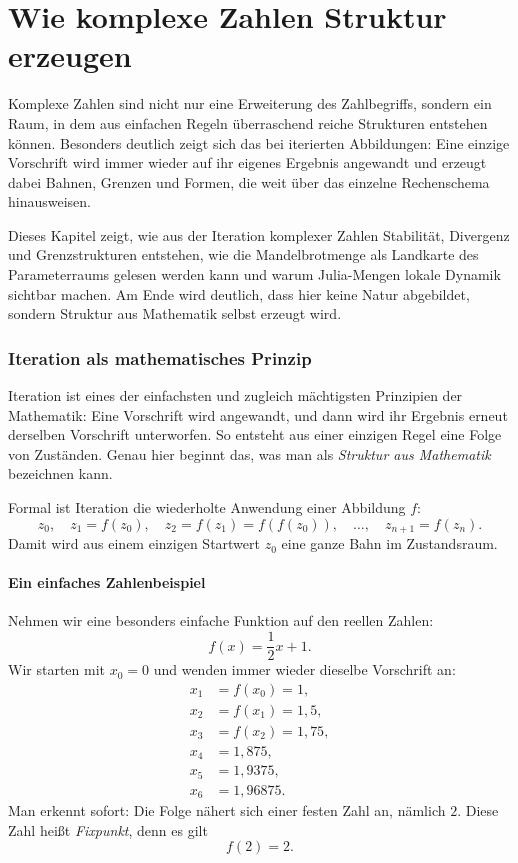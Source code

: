 \chapter{Wie komplexe Zahlen Struktur erzeugen}
\label{chap:VII_komplexe_struktur}

Komplexe Zahlen sind nicht nur eine Erweiterung des Zahlbegriffs,
sondern ein Raum, in dem aus einfachen Regeln überraschend reiche Strukturen entstehen können.
Besonders deutlich zeigt sich das bei iterierten Abbildungen:
Eine einzige Vorschrift wird immer wieder auf ihr eigenes Ergebnis angewandt
und erzeugt dabei Bahnen, Grenzen und Formen,
die weit über das einzelne Rechenschema hinausweisen.

Dieses Kapitel zeigt,
wie aus der Iteration komplexer Zahlen Stabilität, Divergenz und Grenzstrukturen entstehen,
wie die Mandelbrotmenge als Landkarte des Parameterraums gelesen werden kann
und warum Julia-Mengen lokale Dynamik sichtbar machen.
Am Ende wird deutlich,
dass hier keine Natur abgebildet,
sondern Struktur aus Mathematik selbst erzeugt wird.


\subsection{Iteration als mathematisches Prinzip}


Iteration ist eines der einfachsten und zugleich mächtigsten Prinzipien der Mathematik:
Eine Vorschrift wird angewandt, und dann wird ihr Ergebnis erneut derselben Vorschrift unterworfen.
So entsteht aus einer einzigen Regel eine Folge von Zuständen.
Genau hier beginnt das, was man als \emph{Struktur aus Mathematik} bezeichnen kann.

Formal ist Iteration die wiederholte Anwendung einer Abbildung $f$:
\[
z_0,\quad z_1=f(z_0),\quad z_2=f(z_1)=f(f(z_0)),\quad \ldots,\quad z_{n+1}=f(z_n).
\]
Damit wird aus einem einzigen Startwert $z_0$ eine ganze Bahn im Zustandsraum.

\subsubsection*{Ein einfaches Zahlenbeispiel}

Nehmen wir eine besonders einfache Funktion auf den reellen Zahlen:
\[
f(x)=\frac12 x + 1.
\]
Wir starten mit $x_0=0$ und wenden immer wieder dieselbe Vorschrift an:
\[
\begin{aligned}
	x_1 &= f(x_0)=1,\\
	x_2 &= f(x_1)=1{,}5,\\
	x_3 &= f(x_2)=1{,}75,\\
	x_4 &= 1{,}875,\\
	x_5 &= 1{,}9375,\\
	x_6 &= 1{,}96875.
\end{aligned}
\]
Man erkennt sofort:
Die Folge nähert sich einer festen Zahl an, nämlich $2$.
Diese Zahl heißt \emph{Fixpunkt}, denn es gilt
\[
f(2)=2.
\]

